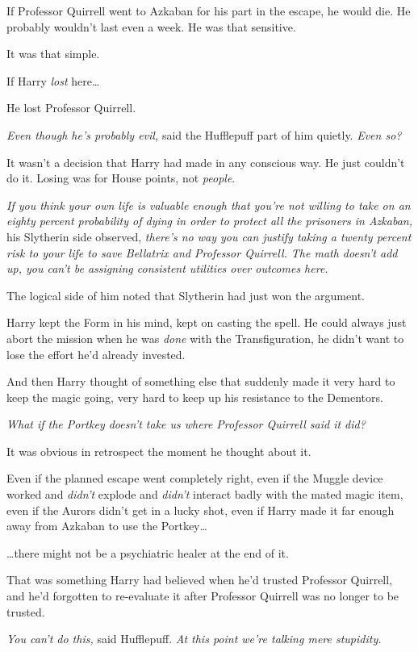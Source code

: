 If Professor Quirrell went to Azkaban for his part in the escape, he would die. He probably wouldn't last even a week. He was that sensitive.

It was that simple.

If Harry \emph{lost} here{\ldots}

He lost Professor Quirrell.

\emph{Even though he's probably evil,} said the Hufflepuff part of him quietly. \emph{Even so?}

It wasn't a decision that Harry had made in any conscious way. He just couldn't do it. Losing was for House points, not \emph{people}.

\emph{If you think your own life is valuable enough that you're not willing to take on an eighty percent probability of dying in order to protect all the prisoners in Azkaban,} his Slytherin side observed, \emph{there's no way you can justify taking a twenty percent risk to your life to save Bellatrix and Professor Quirrell. The math doesn't add up, you can't be assigning consistent utilities over outcomes here.}

The logical side of him noted that Slytherin had just won the argument.

Harry kept the Form in his mind, kept on casting the spell. He could always just abort the mission when he was \emph{done} with the Transfiguration, he didn't want to lose the effort he'd already invested.

And then Harry thought of something else that suddenly made it very hard to keep the magic going, very hard to keep up his resistance to the Dementors.

\emph{What if the Portkey doesn't take us where Professor Quirrell said it did?}

It was obvious in retrospect the moment he thought about it.

Even if the planned escape went completely right, even if the Muggle device worked and \emph{didn't} explode and \emph{didn't} interact badly with the mated magic item, even if the Aurors didn't get in a lucky shot, even if Harry made it far enough away from Azkaban to use the Portkey{\ldots}

{\ldots}there might not be a psychiatric healer at the end of it.

That was something Harry had believed when he'd trusted Professor Quirrell, and he'd forgotten to re-evaluate it after Professor Quirrell was no longer to be trusted.

\emph{You can't do this,} said Hufflepuff. \emph{At this point we're talking mere stupidity.}

